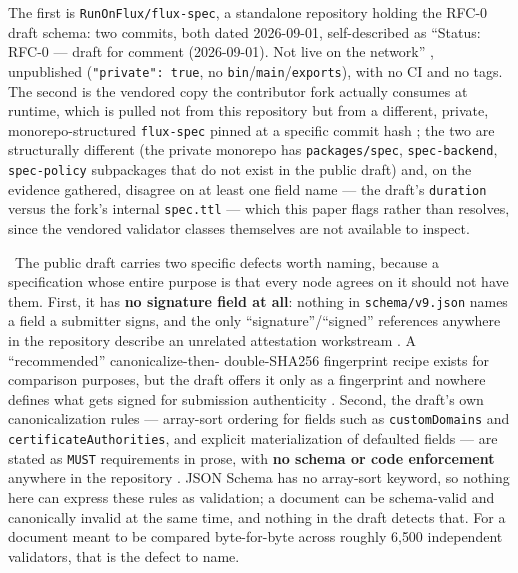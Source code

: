 The first is \texttt{Run\allowbreak{}On\allowbreak{}Flux/\allowbreak{}flux-\allowbreak{}spec}, a standalone repository holding the RFC-0 draft schema:
two commits, both dated 2026-09-01, self-described as ``Status: RFC-0 — draft for comment
(2026-09-01). Not live on the network'' , unpublished
(\texttt{"private":\allowbreak{} true}, no \texttt{bin}\slash\texttt{main}\slash\texttt{exports}), with no CI and no tags.
The second is the vendored copy the contributor fork actually consumes at runtime, which is pulled
not from this repository but from a different, private, monorepo-structured \texttt{flux-spec}
pinned at a specific commit hash
; the two are
structurally different (the private monorepo has \texttt{packages/spec}, \texttt{spec-backend},
\texttt{spec-policy} subpackages that do not exist in the public draft) and, on the evidence
gathered, disagree on at least one field name — the draft's \texttt{duration}
 versus the fork's internal \texttt{spec.ttl}
— which this paper flags rather than resolves, since the vendored validator classes themselves
are not available to inspect.

\inprogress\ The public draft carries two specific defects worth naming, because a specification
whose entire purpose is that every node agrees on it should not have them. First, it has \textbf{no signature
field at all}: nothing in \texttt{schema/v9.json} names a field a submitter signs, and the only
``signature''/``signed'' references anywhere in the repository describe an unrelated \fluxbench
attestation workstream . A ``recommended'' canonicalize-then-
double-SHA256 fingerprint recipe exists for comparison purposes, but the draft offers it only as a
fingerprint and nowhere defines what gets signed for submission
authenticity . Second, the draft's own
canonicalization rules — array-sort ordering for fields such as \texttt{customDomains} and
\texttt{certificate\allowbreak{}Authorities}, and explicit materialization of defaulted fields — are stated as
\texttt{MUST} requirements in prose, with \textbf{no schema or code enforcement} anywhere in the
repository . JSON Schema has no array-sort
keyword, so nothing here can express these rules as validation; a document can be schema-valid and
canonically invalid at the same time, and nothing in the draft detects that. For a document meant to
be compared byte-for-byte across roughly 6{,}500 independent validators, that is the defect to name.

